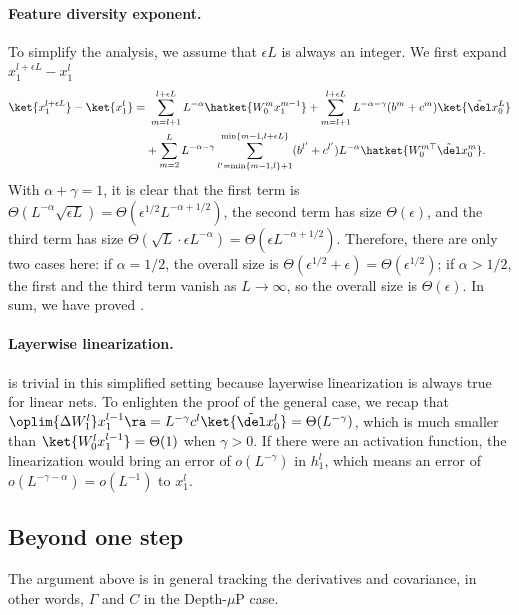 \paragraph{Feature diversity exponent.} To simplify the analysis, we assume that $\epsilon L$ is always an integer. We first expand $x_1^{l+\epsilon L}-x_1^l$ 
\begin{align}
    \ket{x_1^{l+\epsilon L}} - \ket{x_1^{l}}=&~ \sum_{m=l+1}^{l+\epsilon L} L^{-\alpha} \hatket{W_0^m x_1^{m-1}} + \sum_{m=l+1}^{l+\epsilon L} L^{-\alpha-\gamma} (b^m +c^m)\ket{\tilde \del x_0^L} \nonumber\\
    & + \sum_{m=2}^L L^{-\alpha-\gamma} \sum_{l'=\min\{m-1,l\}+1}^{\min\{m-1,l+\epsilon L\}} (b^{l'}+c^{l'}) L^{-\alpha} \hatket{W_0^{m\top}\tilde \del x_0^m}. \nonumber
\end{align}
With $\alpha+\gamma=1$, it is clear that the first term is $\Theta(L^{-\alpha} \sqrt{\epsilon L})=\Theta(\epsilon^{1/2}L^{-\alpha+1/2})$, 
the second term has size $\Theta(\epsilon)$, 
and the third term has size $\Theta(\sqrt L\cdot \epsilon L^{-\alpha})=\Theta(\epsilon L^{-\alpha+1/2})$. Therefore, there are only two cases here: if $\alpha = 1/2$, the overall size is $\Theta(\epsilon^{1/2}+\epsilon)=\Theta(\epsilon^{1/2})$; if $\alpha > 1/2$, the first and the third term vanish as $L\to\infty$, so the overall size is $\Theta(\epsilon)$. In sum, we have proved .

\paragraph{Layerwise linearization.}  is trivial in this simplified setting because layerwise linearization is always true for linear nets. To enlighten the proof of the general case, we recap that $\oplim{\Delta W_1^l} x_1^{l-1} \ra = L^{-\gamma} c^l \ket{\tilde \del x_0^l}=\Theta(L^{-\gamma})$, which is much smaller than $\ket{W_0^l x_1^{l-1}}=\Theta(1)$ when $\gamma > 0$. If there were an activation function, the linearization would bring an error of $o(L^{-\gamma})$ in $h_1^l$, which means an error of $o(L^{-\gamma-\alpha})=o(L^{-1})$ to $x_1^l$.

\subsection{Beyond one step}
The argument above is in general tracking the derivatives and covariance, in other words, $\Gamma$ and $C$ in the Depth-$\mu$P case. 

